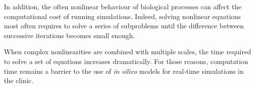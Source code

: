\documentclass[12pt,a4paper]{article}
\begin{document}
In addition, the often nonlinear behaviour of biological processes can affect the computational cost of running simulations.
Indeed, solving nonlinear equations most often requires to solve a series of subproblems until the difference between successive iterations becomes small enough.

When complex nonlinearities are combined with multiple scales, the time required to solve a set of equations increases dramatically.
For those reasons, computation time remains a barrier to the use of \textit{in silico} models for real-time simulations in the clinic.



\end{document}
